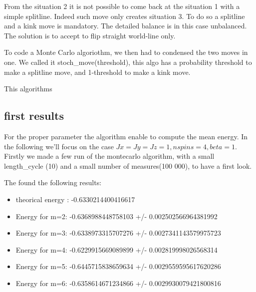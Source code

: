 \documentclass[a4paper,12pt,twoside]{article}
\begin{document}
	 From the situation 2 it is not possible to come back at the situation 1 with a simple splitline. Indeed such move only creates situation 3. To do so a splitline and a kink move is mandatory. The detailed balance is in this case unbalanced.
	 The solution is to accept to flip straight world-line only.
	 
	 To code a Monte Carlo algoriothm, we then had to condensed the two moves in one. We called it stoch\_move(threshold), this algo has a probability threshold to make a splitline move, and 1-threshold to make a kink move.
	 
	 
	 
	 
	 This algorithms 
	 \subsection{first results}
	 For the proper parameter the algorithm enable to compute the mean energy. In the following we'll focus on the case $Jx = Jy = Jz =1, nspins = 4, beta = 1$.
	 Firstly we made a few run of the montecarlo algorithm, with a small length\_cycle (10) and a small number of measures(100 000), to have a first look.
	 
	 The found the following results:
	 \begin{itemize}
			 	\item theorical energy : -0.6330214400416617
			 	\item Energy for m=2: -0.6368988448758103 +/- 0.002502566964381992
			 	\item Energy for m=3: -0.6338973315707276 +/- 0.0027341143579975723
			 	\item Energy for m=4: -0.6229915669089899 +/- 0.002819998026568314
			 	\item Energy for m=5: -0.6445715838659634 +/- 0.0029559595617620286
			 	\item Energy for m=6: -0.6358614671234866 +/- 0.0029930079421800816
	 \end{itemize}
	 
\end{document}
